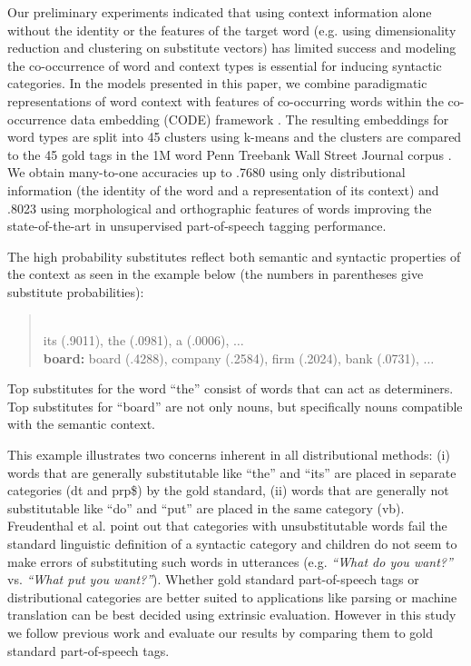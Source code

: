 Our preliminary experiments indicated that using context information
alone without the identity or the features of the target word
(e.g. using dimensionality reduction and clustering on substitute
vectors) has limited success and modeling the co-occurrence of word
and context types is essential for inducing syntactic categories.  In
the models presented in this paper, we combine paradigmatic
representations of word context with features of co-occurring words
within the co-occurrence data embedding (CODE) framework
\cite{globerson2007euclidean,maron2010sphere}.  The resulting
embeddings for word types are split into 45 clusters using k-means and
the clusters are compared to the 45 gold tags in the 1M word Penn
Treebank Wall Street Journal corpus \cite{treebank3}.  We obtain
many-to-one accuracies up to .7680 using only distributional
information (the identity of the word and a representation of its
context) and .8023 using morphological and orthographic features of
words improving the state-of-the-art in unsupervised part-of-speech
tagging performance.

The high probability substitutes reflect both semantic and syntactic
properties of the context as seen in the example below (the numbers in
parentheses give substitute probabilities):

\begin{quote}
\\
 its (.9011), the (.0981), a (.0006), $\ldots$\\
{\bf board:} board (.4288), company (.2584), firm (.2024), bank (.0731), $\ldots$
\end{quote}

Top substitutes for the word ``the'' consist of words that can act as
determiners.  Top substitutes for ``board'' are not only nouns, but
specifically nouns compatible with the semantic context.

This example illustrates two concerns inherent in all distributional
methods: (i) words that are generally substitutable like ``the'' and
``its'' are placed in separate categories ({\sc dt} and {\sc prp\$})
by the gold standard, (ii) words that are generally not substitutable
like ``do'' and ``put'' are placed in the same category ({\sc vb}).
Freudenthal et al.  point out
that categories with unsubstitutable words fail the standard
linguistic definition of a syntactic category and children do not seem
to make errors of substituting such words in utterances
(e.g. {\em``What do you want?''}  vs. {\em *``What put you want?''}).
Whether gold standard part-of-speech tags or distributional categories
are better suited to applications like parsing or machine translation
can be best decided using extrinsic evaluation.  However in this study
we follow previous work and evaluate our results by comparing them to
gold standard part-of-speech tags.

